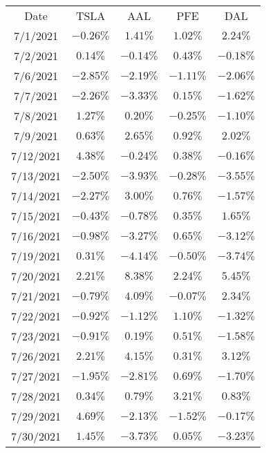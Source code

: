 \documentclass[12pt]{article}
\begin{document}
\begin{center}
\begin{tabular}{c|c|c|c|c}
Date&TSLA&AAL&PFE&DAL\\
7/1/2021&$-0.26\%$&$1.41\%$&$1.02\%$&$2.24\%$\\
7/2/2021&$0.14\%$&$-0.14\%$&$0.43\%$&$-0.18\%$\\
7/6/2021&$-2.85\%$&$-2.19\%$&$-1.11\%$&$-2.06\%$\\
7/7/2021&$-2.26\%$&$-3.33\%$&$0.15\%$&$-1.62\%$\\
7/8/2021&$1.27\%$&$0.20\%$&$-0.25\%$&$-1.10\%$\\
7/9/2021&$0.63\%$&$2.65\%$&$0.92\%$&$2.02\%$\\
7/12/2021&$4.38\%$&$-0.24\%$&$0.38\%$&$-0.16\%$\\
7/13/2021&$-2.50\%$&$-3.93\%$&$-0.28\%$&$-3.55\%$\\
7/14/2021&$-2.27\%$&$3.00\%$&$0.76\%$&$-1.57\%$\\
7/15/2021&$-0.43\%$&$-0.78\%$&$0.35\%$&$1.65\%$\\
7/16/2021&$-0.98\%$&$-3.27\%$&$0.65\%$&$-3.12\%$\\
7/19/2021&$0.31\%$&$-4.14\%$&$-0.50\%$&$-3.74\%$\\
7/20/2021&$2.21\%$&$8.38\%$&$2.24\%$&$5.45\%$\\
7/21/2021&$-0.79\%$&$4.09\%$&$-0.07\%$&$2.34\%$\\
7/22/2021&$-0.92\%$&$-1.12\%$&$1.10\%$&$-1.32\%$\\
7/23/2021&$-0.91\%$&$0.19\%$&$0.51\%$&$-1.58\%$\\
7/26/2021&$2.21\%$&$4.15\%$&$0.31\%$&$3.12\%$\\
7/27/2021&$-1.95\%$&$-2.81\%$&$0.69\%$&$-1.70\%$\\
7/28/2021&$0.34\%$&$0.79\%$&$3.21\%$&$0.83\%$\\
7/29/2021&$4.69\%$&$-2.13\%$&$-1.52\%$&$-0.17\%$\\
7/30/2021&$1.45\%$&$-3.73\%$&$0.05\%$&$-3.23\%$\\
\end{tabular}
\end{center}
\end{document}
